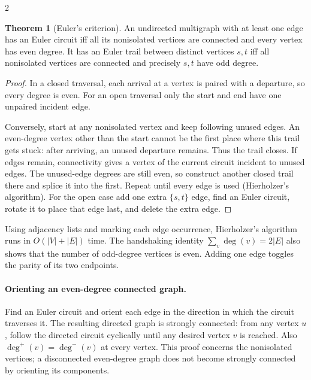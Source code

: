 \documentclass[8pt]{extarticle}
\theoremstyle{definition}
\newtheorem{theorem}[definition]{Theorem}
\begin{document}
\begin{multicols*}{2}
\begin{theorem}[Euler's criterion]
An undirected multigraph with at least one edge has an Euler circuit iff
all its nonisolated vertices are connected and every vertex has even degree.
It has an Euler trail between distinct vertices $s,t$ iff all nonisolated
vertices are connected and precisely $s,t$ have odd degree.
\end{theorem}
\begin{proof}
In a closed traversal, each arrival at a vertex is paired with a departure,
so every degree is even.  For an open traversal only the start and end have
one unpaired incident edge.

Conversely, start at any nonisolated vertex and keep following unused edges.
An even-degree vertex other than the start cannot be the first place where
this trail gets stuck: after arriving, an unused departure remains.  Thus
the trail closes.  If edges remain, connectivity gives a vertex of the
current circuit incident to unused edges.  The unused-edge degrees are
still even, so construct another closed trail there and splice it into the
first.  Repeat until every edge is used (Hierholzer's algorithm).
For the open case add one extra $\{s,t\}$ edge, find an Euler circuit,
rotate it to place that edge last, and delete the extra edge.
\end{proof}
Using adjacency lists and marking each edge occurrence, Hierholzer's
algorithm runs in $O(|V|+|E|)$ time.  The handshaking identity
$\sum_v\deg(v)=2|E|$ also shows that the number of odd-degree vertices is
even.  Adding one edge toggles the parity of its two endpoints.

\paragraph{Orienting an even-degree connected graph.}
Find an Euler circuit and orient each edge in the direction in which the
circuit traverses it.  The resulting directed graph is strongly connected:
from any vertex $u$, follow the directed circuit cyclically until any desired
vertex $v$ is reached.  Also $\deg^+(v)=\deg^-(v)$ at every vertex.
This proof concerns the nonisolated vertices; a disconnected even-degree
graph does not become strongly connected by orienting its components.


\end{multicols*}
\end{document}
